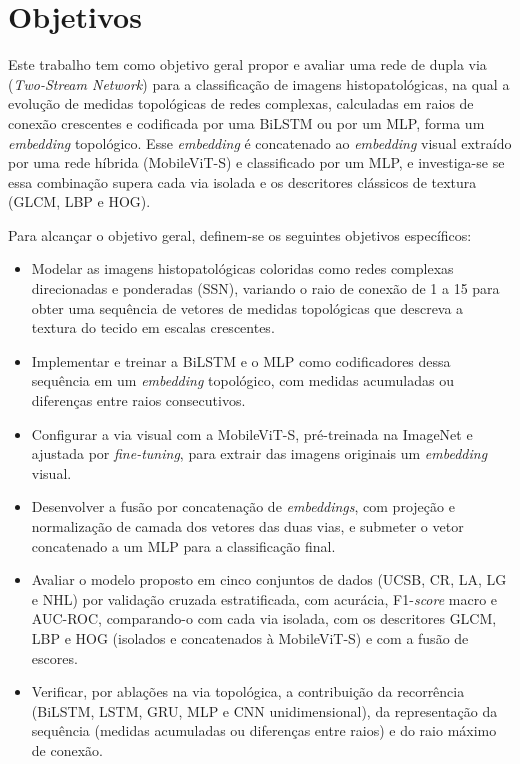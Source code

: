 \chapter{Objetivos}

Este trabalho tem como objetivo geral propor e avaliar uma rede de dupla via (\textit{Two-Stream Network}) para a classificação de imagens histopatológicas, na qual a evolução de medidas topológicas de redes complexas, calculadas em raios de conexão crescentes e codificada por uma BiLSTM ou por um MLP, forma um \textit{embedding} topológico. Esse \textit{embedding} é concatenado ao \textit{embedding} visual extraído por uma rede híbrida (MobileViT-S) e classificado por um MLP, e investiga-se se essa combinação supera cada via isolada e os descritores clássicos de textura (GLCM, LBP e HOG).

Para alcançar o objetivo geral, definem-se os seguintes objetivos específicos:

\begin{itemize}
    \item Modelar as imagens histopatológicas coloridas como redes complexas direcionadas e ponderadas (SSN), variando o raio de conexão de 1 a 15 para obter uma sequência de vetores de medidas topológicas que descreva a textura do tecido em escalas crescentes.

    \item Implementar e treinar a BiLSTM e o MLP como codificadores dessa sequência em um \textit{embedding} topológico, com medidas acumuladas ou diferenças entre raios consecutivos.

    \item Configurar a via visual com a MobileViT-S, pré-treinada na ImageNet e ajustada por \textit{fine-tuning}, para extrair das imagens originais um \textit{embedding} visual.

    \item Desenvolver a fusão por concatenação de \textit{embeddings}, com projeção e normalização de camada dos vetores das duas vias, e submeter o vetor concatenado a um MLP para a classificação final.

    \item Avaliar o modelo proposto em cinco conjuntos de dados (UCSB, CR, LA, LG e NHL) por validação cruzada estratificada, com acurácia, F1-\textit{score} macro e AUC-ROC, comparando-o com cada via isolada, com os descritores GLCM, LBP e HOG (isolados e concatenados à MobileViT-S) e com a fusão de escores.

    \item Verificar, por ablações na via topológica, a contribuição da recorrência (BiLSTM, LSTM, GRU, MLP e CNN unidimensional), da representação da sequência (medidas acumuladas ou diferenças entre raios) e do raio máximo de conexão.
\end{itemize}
